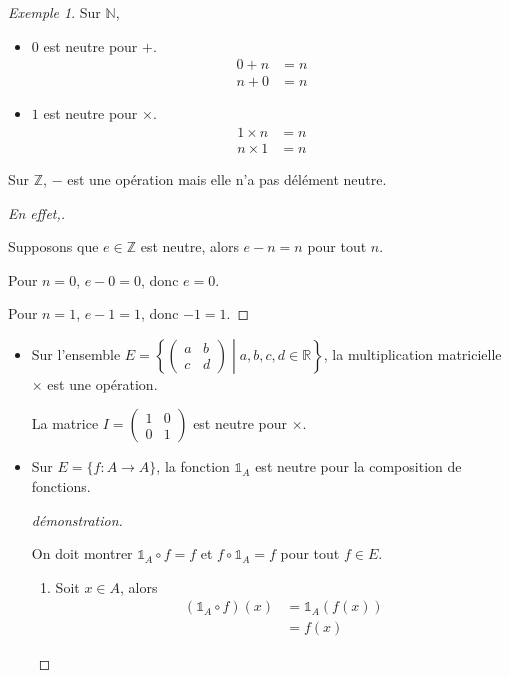 \documentclass{report}
\newcommand*{\reels}{\mathbb{R}}
\newcommand*{\entiers}{\mathbb{Z}}
\newcommand*{\naturels}{\mathbb{N}}
\theoremstyle{definition}
\theoremstyle{remark}
\newtheorem*{exem}{Exemple}
\begin{document}
	\begin{exem}
		Sur $\naturels$,

		\begin{itemize}
			\item $0$ est neutre pour $+$.
			\begin{align*}
				0+n&=n\\
				n+0&=n
			\end{align*}
			\item $1$ est neutre pour $\times$.
			\begin{align*}
				1 \times n&=n\\
				n \times 1&=n
			\end{align*}
		\end{itemize}

		Sur $\entiers$, $-$ est une op\'eration mais elle n'a pas d\'el\'ement neutre.
		\renewcommand{\qedsymbol}{\lightning}
		\begin{proof}[En effet,]~

			Supposons que $e \in \entiers$ est neutre, alors $e-n=n$ pour tout $n$.

			Pour $n=0$, $e-0=0$, donc $e=0$.

			Pour $n=1$, $e-1=1$, donc $-1=1$.
		\end{proof}
		\renewcommand{\qedsymbol}{$\square$}
		\begin{itemize}
			\item Sur l'ensemble $E=\left\lbrace \left( \begin{array}{cc}
				a&b\\c&d
			\end{array}\right) \middle| a,b,c,d \in \reels\right\rbrace$, la multiplication matricielle $\times$ est une op\'eration.

			La matrice $I=\left( \begin{array}{cc}
				1&0\\0&1
			\end{array}\right)$ est neutre pour $\times$.
			\item Sur $E=\{f:A \to A\}$, la fonction $\mathds{1}_A$ est neutre pour la composition de fonctions.
			\begin{proof}[d\'emonstration]~

				On doit montrer $\mathds{1}_A \circ f=f$ et $f \circ \mathds{1}_A=f$ pour tout $f \in E$.
				\begin{enumerate}[label=(\arabic*)]
					\item Soit $x \in A$, alors
					\begin{align*}
						(\mathds{1}_A \circ f)(x)&= \mathds{1}_A(f(x))\\
						&= f(x)
					\end{align*}


\end{enumerate}
\end{proof}
\end{itemize}
\end{exem}
\end{document}
